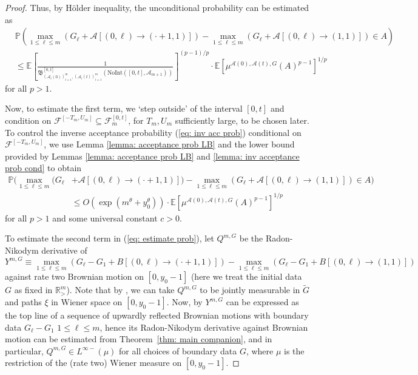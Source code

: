\documentclass[11pt, reqno]{amsart}
\numberwithin{equation}{section}
\newcommand{\R}{\ensuremath{\mathbb{R}}}
\newcommand{\PP}{\ensuremath{\mathbb{P}}}
\begin{document}
\begin{proof}
Thus, by H\"{o}lder inequality, the unconditional probability can be estimated as 
\begin{equation*}
    \begin{array}{ll}
         & \PP \left( \displaystyle\max_{1\le \ell \le m}(G_\ell + \mathcal{A}[(0,\ell)\to (\cdot+1,1)])-\displaystyle\max_{1\le \ell \le m}(G_\ell + \mathcal{A}[(0,\ell)\to (1,1)])\in A \right)\\
         & \le\mathbb{E}\left [\displaystyle\frac{1}{\mathfrak{B}^{[0,t]}_{(\mathcal{A}_i(0))_{i=1}^m, (\mathcal{A}_i(t))_{i=1}^m}(\mathrm{NoInt}([0,t], \mathcal{A}_{m+1}))} \right ]^{(p-1)/p}  \cdot  \mathbb{E}\left[\mu^{\mathcal{A}(0), \mathcal{A}(t), G}(A)^{p-1}\right]^{1/p}
    \end{array}
\end{equation*}
for all $p>1$.

Now, to estimate the first term, we `step outside' of the interval $[0,t]$ and condition on $\mathscr{F}^{[-T_m,U_m]}\subseteq \mathscr{F}^{[0,t]}_m$, for $T_m, U_m$ sufficiently large, to be chosen later. To control the inverse acceptance probability (\ref{eq: inv acc prob}) conditional on $\mathscr{F}^{[-T_m,U_m]}$, we use Lemma \ref{lemma: acceptance prob LB} and the lower bound provided by Lemmas \ref{lemma: acceptance prob LB} and \ref{lemma: inv acceptance prob cond} to obtain
\begin{align}\label{eq: estimate prob}
         \PP ( \displaystyle\max_{1\le \ell \le m}(G_\ell &+ \mathcal{A}[(0,\ell)\to (\cdot+1,1)])-\displaystyle\max_{1\le \ell \le m}(G_\ell + \mathcal{A}[(0,\ell)\to (1,1)])\in A )\nonumber\\
         & \le O(\exp(m^\theta + y_0^\theta))  \cdot  \mathbb{E}\left[\mu^{\mathcal{A}(0), \mathcal{A}(t), G}(A)^{p-1}\right]^{1/p}
    \end{align}
for all $p>1$ and some universal constant $c>0$.

To estimate the second term in (\ref{eq: estimate prob}), let $Q^{m, G}$ be the Radon-Nikodym  derivative of 
\begin{equation*}
Y^{m, G}\equiv \displaystyle\max_{1\le \ell \le m}(G_{\ell} -G_1 + B[(0,\ell)\to (\cdot+1,1)])-\displaystyle\max_{1\le \ell \le m}(G_{\ell} -G_1 + B[(0,\ell)\to (1,1)])
\end{equation*}
against rate two Brownian motion on $[0, y_0-1]$ (here we treat the initial data $G$ as fixed in $\R^m_>$). Note that by \cite[Theorem~58]{dellacherie2011probabilities}, we can take $Q^{m, G}$ to be jointly measurable in $\tilde{G}$ and paths $\xi$ in Wiener space on $[0,y_0-1]$. Now, by \cite[Theorem~4.3]{sarkar2021brownian} $Y^{m, G}$ can be expressed as the top line of a sequence of upwardly reflected Brownian motions with boundary data $G_{\ell} -G_1$ $1\le \ell\le m$, hence its Radon-Nikodym  derivative against Brownian motion can be estimated from Theorem~\ref{thm: main companion}, and in particular, $Q^{m, G}\in L^{\infty-}(\mu)$ for all choices of boundary data $G$, where $\mu$ is the restriction of the (rate two) Wiener measure on $[0,y_0-1]$.


\end{proof}
\end{document}
